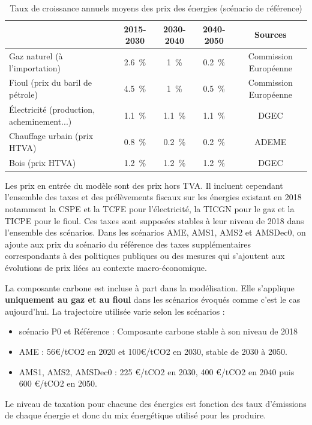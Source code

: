 \documentclass[10.5pt,a4paper]{article}
\begin{document}
{\begin{table}[h!]
\caption{Taux de croissance annuels moyens des prix des énergies (scénario de référence)}
\begin{center}
\begin{tabular}{|l|c|c|c|c|}
\hline
										& 2015-2030	& 2030-2040	& 2040-2050 &  Sources \\
\hline
Gaz naturel		(à l'importation)									& 	2.6~\%	& 1~\%	& 0.2~\%	 & Commission Européenne \\
Fioul (prix du baril de pétrole)								& 4.5~\%	& 1~\%	& 0.5~\%	 & Commission Européenne\\
Électricité	(production, acheminement...)				& 1.1~\%	& 1.1~\%	& 1.1~\%  & DGEC \\
Chauffage urbain (prix HTVA) 										& 0.8~\%	& 0.2~\%	&  0.2~\%	 & ADEME\\
Bois  (prix HTVA)  															& 1.2~\%	& 1.2~\%	& 1.2~\%	& DGEC \\
\hline
\end{tabular}
\end{center}
\end{table}

Les prix en entrée du modèle sont des prix hors TVA. Il incluent cependant l'ensemble des taxes et des prélèvements fiscaux sur les énergies existant en 2018 notamment la CSPE et la TCFE pour l'électricité, la TICGN pour le gaz et la TICPE pour le fioul. Ces taxes sont supposées stables à leur niveau de 2018 dans l'ensemble des scénarios. Dans les scénarios AME, AMS1, AMS2 et AMSDec0, on ajoute aux prix du scénario du référence des taxes supplémentaires correspondants à des politiques publiques ou des mesures qui s'ajoutent aux évolutions de prix liées au contexte macro-économique. 
 
La composante carbone est incluse à part dans la modélisation. Elle s’applique \textbf{uniquement au gaz et au fioul} dans les scénarios évoqués comme c'est le cas aujourd'hui. La trajectoire utilisée varie selon les scénarios :
\begin{itemize}
	\item scénario P0 et Référence : Composante carbone stable à son niveau de 2018
	\item AME : 56€/tCO2 en 2020 et 100€/tCO2 en 2030, stable de 2030 à 2050.
	\item AMS1, AMS2, AMSDec0 : 225 €/tCO2 en 2030, 400 €/tCO2 en 2040 puis 600 €/tCO2 en 2050.
\end{itemize}

Le niveau de taxation pour chacune des énergies est fonction des taux d’émissions de chaque énergie et donc du mix énergétique utilisé pour les produire.

}
\end{document}
